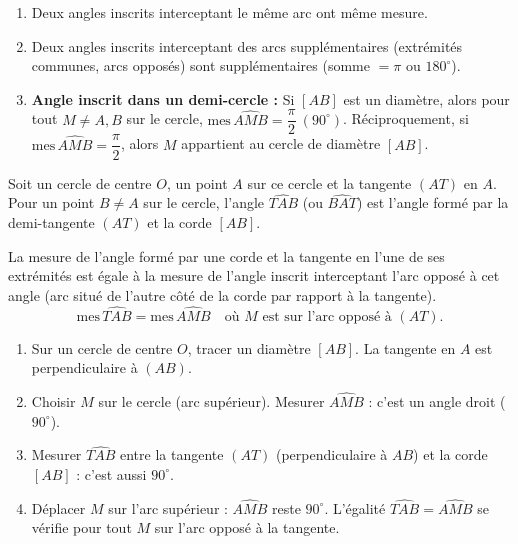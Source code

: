 \documentclass[11pt]{article}
\begin{document}
\begin{propriete}
\begin{enumerate}
\item Deux angles inscrits interceptant le même arc ont même mesure.
\item Deux angles inscrits interceptant des arcs supplémentaires (extrémités communes, arcs opposés) sont supplémentaires (somme $= \pi$ ou $180^\circ$).
\item \textbf{Angle inscrit dans un demi-cercle :} Si $[AB]$ est un diamètre, alors pour tout $M \neq A,B$ sur le cercle, $\mathrm{mes}\,\widehat{AMB} = \dfrac{\pi}{2}\ (90^\circ)$. Réciproquement, si $\mathrm{mes}\,\widehat{AMB} = \dfrac{\pi}{2}$, alors $M$ appartient au cercle de diamètre $[AB]$.
\end{enumerate}
\end{propriete}

\begin{definition}
Soit un cercle de centre $O$, un point $A$ sur ce cercle et la tangente $(AT)$ en $A$. Pour un point $B \neq A$ sur le cercle, l'angle $\widehat{TAB}$ (ou $\widehat{BAT}$) est l'angle formé par la demi-tangente $(AT)$ et la corde $[AB]$.
\end{definition}

\begin{propriete}
La mesure de l'angle formé par une corde et la tangente en l'une de ses extrémités est égale à la mesure de l'angle inscrit interceptant l'arc opposé à cet angle (arc situé de l'autre côté de la corde par rapport à la tangente).
\[ \mathrm{mes}\,\widehat{TAB} = \mathrm{mes}\,\widehat{AMB} \quad \text{où } M \text{ est sur l'arc opposé à } (AT). \]
\end{propriete}

\begin{experience}
\begin{enumerate}
\item Sur un cercle de centre $O$, tracer un diamètre $[AB]$. La tangente en $A$ est perpendiculaire à $(AB)$.
\item Choisir $M$ sur le cercle (arc supérieur). Mesurer $\widehat{AMB}$ : c'est un angle droit ($90^\circ$).
\item Mesurer $\widehat{TAB}$ entre la tangente $(AT)$ (perpendiculaire à $AB$) et la corde $[AB]$ : c'est aussi $90^\circ$.
\item Déplacer $M$ sur l'arc supérieur : $\widehat{AMB}$ reste $90^\circ$. L'égalité $\widehat{TAB} = \widehat{AMB}$ se vérifie pour tout $M$ sur l'arc opposé à la tangente.
\end{enumerate}
\end{experience}
\end{document}
